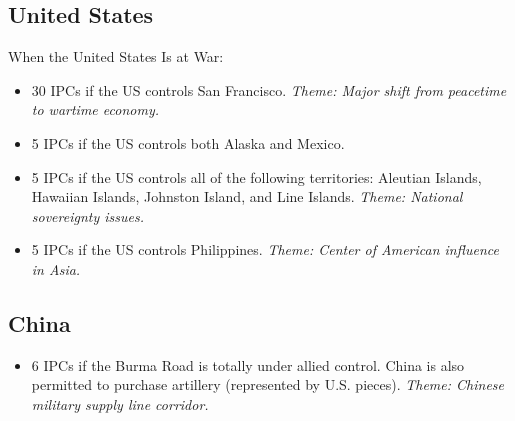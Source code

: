 \documentclass[10pt,twoside]{article}
\begin{document}
\begin{multicols*}{3}
\subsection*{United States}
When the United States Is at War:
\begin{itemize}
\item 30 IPCs if the US controls San Francisco. \textsl{Theme: Major shift from peacetime to wartime economy.}
\item 5 IPCs if the US controls both Alaska and Mexico.
\item 5 IPCs if the US controls all of the following territories: Aleutian Islands, Hawaiian Islands, Johnston Island, and Line Islands. \textsl{Theme: National sovereignty issues.}
\item 5 IPCs if the US controls Philippines. \textsl{Theme: Center of American influence in Asia.}
\end{itemize}

\subsection*{China}
\begin{itemize}
\item 6 IPCs if the Burma Road is totally under allied control. China is also permitted to purchase artillery (represented by U.S. pieces). \textsl{Theme: Chinese military supply line corridor.}
\end{itemize}

\end{multicols*}
\end{document}
